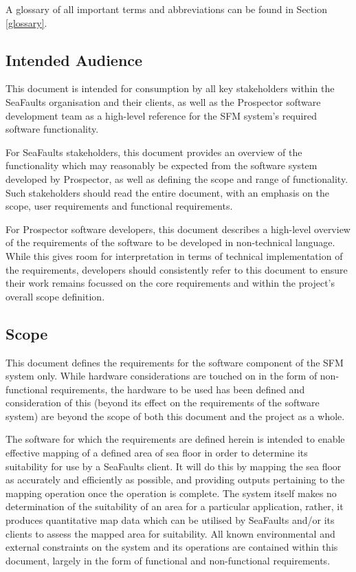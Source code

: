 \documentclass[12pt]{article}
\begin{document}
A glossary of all important terms and abbreviations can be found in
Section \ref{glossary}.

\subsection{Intended Audience}

This document is intended for consumption by all key stakeholders
within the SeaFaults organisation and their clients, as well as the
Prospector software development team as a high-level reference for
the SFM system's required software functionality. 

For SeaFaults stakeholders, this document provides an overview of
the functionality which may reasonably be expected from the software
system developed by Prospector, as well as defining the scope and
range of functionality. Such stakeholders should read the entire document,
with an emphasis on the scope, user requirements and functional requirements. 

For Prospector software developers, this document describes a high-level
overview of the requirements of the software to be developed in non-technical
language. While this gives room for interpretation in terms of technical
implementation of the requirements, developers should consistently
refer to this document to ensure their work remains focussed on the
core requirements and within the project's overall scope definition.

\subsection{Scope}

This document defines the requirements for the software component
of the SFM system only. While hardware considerations are touched
on in the form of non-functional requirements, the hardware to be
used has been defined and consideration of this (beyond its effect
on the requirements of the software system) are beyond the scope of
both this document and the project as a whole. 

The software for which the requirements are defined herein is intended
to enable effective mapping of a defined area of sea floor in order
to determine its suitability for use by a SeaFaults client. It will
do this by mapping the sea floor as accurately and efficiently as
possible, and providing outputs pertaining to the mapping operation
once the operation is complete. The system itself makes no determination
of the suitability of an area for a particular application, rather,
it produces quantitative map data which can be utilised by SeaFaults
and/or its clients to assess the mapped area for suitability. All
known environmental and external constraints on the system and its
operations are contained within this document, largely in the form
of functional and non-functional requirements.
\end{document}
